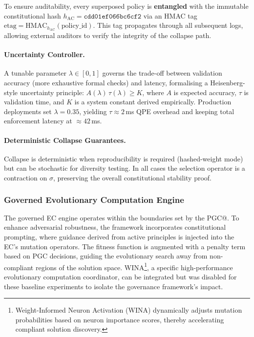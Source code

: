 To ensure auditability, every superposed policy is \textbf{entangled} with the immutable constitutional hash $h_{\text{AC}}=\texttt{cdd01ef066bc6cf2}$ via an HMAC tag $\text{etag}=\text{HMAC}_{h_{\text{AC}}}(\text{policy\_id})$.  This tag propagates through all subsequent logs, allowing external auditors to verify the integrity of the collapse path.

\paragraph{Uncertainty Controller.}  A tunable parameter $\lambda\!\in\![0,1]$ governs the trade-off between validation accuracy (more exhaustive formal checks) and latency, formalising a Heisenberg-style uncertainty principle: $A(\lambda)\,\tau(\lambda)\ge K$, where $A$ is expected accuracy, $\tau$ is validation time, and $K$ is a system constant derived empirically.  Production deployments set $\lambda=0.35$, yielding $\tau\approx2$\,ms QPE overhead and keeping total enforcement latency at $\approx42$\,ms.

\paragraph{Deterministic Collapse Guarantees.}  Collapse is deterministic when reproducibility is required (hashed-weight mode) but can be stochastic for diversity testing.  In all cases the selection operator is a contraction on $\sigma$, preserving the overall constitutional stability proof.

\subsubsection{Governed Evolutionary Computation Engine}
The governed EC engine operates within the boundaries set by the PGC@. To enhance adversarial robustness, the framework incorporates constitutional prompting, where guidance derived from active principles is injected into the EC's mutation operators. The fitness function is augmented with a penalty term based on PGC decisions, guiding the evolutionary search away from non-compliant regions of the solution space. WINA\footnote{Weight-Informed Neuron Activation (WINA) dynamically adjusts mutation probabilities based on neuron importance scores, thereby accelerating compliant solution discovery.}, a specific high-performance evolutionary computation coordinator, can be integrated but was disabled for these baseline experiments to isolate the governance framework's impact.
